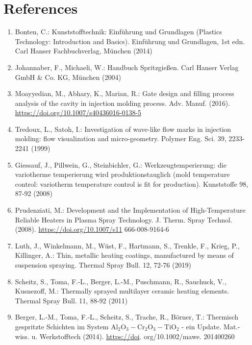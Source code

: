 \documentclass[10pt]{article}
\begin{document}
\section*{References}
\begin{enumerate}
  \item Bonten, C.: Kunststofftechnik: Einführung und Grundlagen (Plastics Technology: Introduction and Basics). Einführung und Grundlagen, 1st edn. Carl Hanser Fachbuchverlag, München (2014)

  \item Johannaber, F., Michaeli, W.: Handbuch Spritzgießen. Carl Hanser Verlag GmbH \& Co. KG, München (2004)

  \item Moayyedian, M., Abhary, K., Marian, R.: Gate design and filling process analysis of the cavity in injection molding process. Adv. Manuf. (2016). \href{https://doi.org/10.1007/s40436016-0138-5}{https://doi.org/10.1007/s40436016-0138-5}

  \item Tredoux, L., Satoh, I.: Investigation of wave-like flow marks in injection molding: flow visualization and micro-geometry. Polymer Eng. Sci. 39, 2233-2241 (1999)

  \item Giessauf, J., Pillwein, G., Steinbichler, G.: Werkzeugtemperierung: die variotherme temperierung wird produktionstauglich (mold temperature control: variotherm temperature control is fit for production). Kunststoffe 98, 87-92 (2008)

  \item Prudenziati, M.: Development and the Implementation of High-Temperature Reliable Heaters in Plasma Spray Technology. J. Therm. Spray Technol. (2008). \href{https://doi.org/10.1007/s11}{https://doi.org/10.1007/s11} 666-008-9164-6

  \item Luth, J., Winkelmann, M., Wüst, F., Hartmann, S., Trenkle, F., Krieg, P., Killinger, A.: Thin, metallic heating coatings, manufactured by means of suspension spraying. Thermal Spray Bull. 12, 72-76 (2019)

  \item Scheitz, S., Toma, F.-L., Berger, L.-M., Puschmann, R., Sauchuck, V., Kusnezoff, M.: Thermally sprayed multilayer ceramic heating elements. Thermal Spray Bull. 11, 88-92 (2011)

  \item Berger, L.-M., Toma, F.-L., Scheitz, S., Trache, R., Börner, T.: Thermisch gespritzte Schichten im System $\mathrm{Al}_{2} \mathrm{O}_{3}-\mathrm{Cr}_{2} \mathrm{O}_{3}-\mathrm{TiO}_{2}$ - ein Update. Mat.-wiss. u. Werkstofftech (2014). \href{https://doi}{https://doi}. org/10.1002/mawe. 201400260


\end{enumerate}
\end{document}
